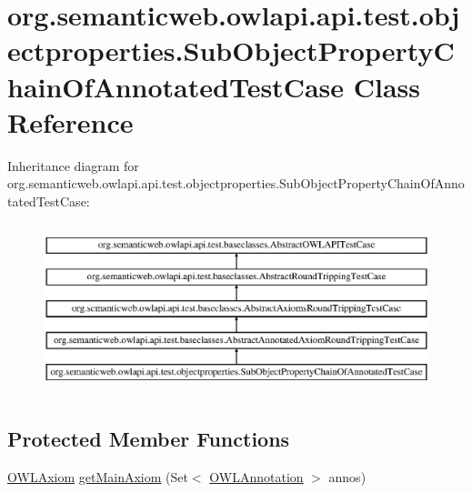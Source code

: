 \hypertarget{classorg_1_1semanticweb_1_1owlapi_1_1api_1_1test_1_1objectproperties_1_1_sub_object_property_chain_of_annotated_test_case}{\section{org.\-semanticweb.\-owlapi.\-api.\-test.\-objectproperties.\-Sub\-Object\-Property\-Chain\-Of\-Annotated\-Test\-Case Class Reference}
\label{classorg_1_1semanticweb_1_1owlapi_1_1api_1_1test_1_1objectproperties_1_1_sub_object_property_chain_of_annotated_test_case}
}
Inheritance diagram for org.\-semanticweb.\-owlapi.\-api.\-test.\-objectproperties.\-Sub\-Object\-Property\-Chain\-Of\-Annotated\-Test\-Case\-:\begin{figure}[H]
\begin{center}
\leavevmode
\includegraphics[height=4.982206cm]{classorg_1_1semanticweb_1_1owlapi_1_1api_1_1test_1_1objectproperties_1_1_sub_object_property_chain_of_annotated_test_case}
\end{center}
\end{figure}
\subsection*{Protected Member Functions}
\begin{DoxyCompactItemize}
\item 
\hyperlink{interfaceorg_1_1semanticweb_1_1owlapi_1_1model_1_1_o_w_l_axiom}{O\-W\-L\-Axiom} \hyperlink{classorg_1_1semanticweb_1_1owlapi_1_1api_1_1test_1_1objectproperties_1_1_sub_object_property_chain_of_annotated_test_case_a0991c15d4d2d9c3374c63208a5f355de}{get\-Main\-Axiom} (Set$<$ \hyperlink{interfaceorg_1_1semanticweb_1_1owlapi_1_1model_1_1_o_w_l_annotation}{O\-W\-L\-Annotation} $>$ annos)
\end{DoxyCompactItemize}
